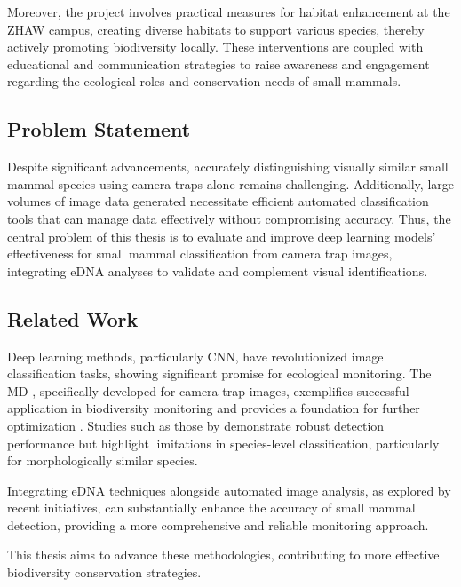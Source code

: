 Moreover, the project involves practical measures for habitat enhancement at the \ac{ZHAW} campus, creating diverse habitats to support various species, thereby actively promoting biodiversity locally.
These interventions are coupled with educational and communication strategies to raise awareness and engagement regarding the ecological roles and conservation needs of small mammals.

\subsection{Problem Statement}

Despite significant advancements, accurately distinguishing visually similar small mammal species using camera traps alone remains challenging.
Additionally, large volumes of image data generated necessitate efficient automated classification tools that can manage data effectively without compromising accuracy.
Thus, the central problem of this thesis is to evaluate and improve deep learning models' effectiveness for small mammal classification from camera trap images, integrating \ac{eDNA} analyses to validate and complement visual identifications.

\subsection{Related Work}

Deep learning methods, particularly \ac{CNN}, have revolutionized image classification tasks, showing significant promise for ecological monitoring.
The \ac{MD} \autocite{morrisEfficientPipelineCamera2025}, specifically developed for camera trap images, exemplifies successful application in biodiversity monitoring and provides a foundation for further optimization \autocite{hernandezPytorchWildlifeCollaborativeDeep2024, velezChoosingAppropriatePlatform2022, schneiderRecognitionEuropeanMammals2024}.
Studies such as those by \textcite{velezChoosingAppropriatePlatform2022,schneiderRecognitionEuropeanMammals2024} demonstrate robust detection performance but highlight limitations in species-level classification, particularly for morphologically similar species.

Integrating \ac{eDNA} techniques alongside automated image analysis, as explored by recent initiatives, can substantially enhance the accuracy of small mammal detection, providing a more comprehensive and reliable monitoring approach.

This thesis aims to advance these methodologies, contributing to more effective biodiversity conservation strategies.
